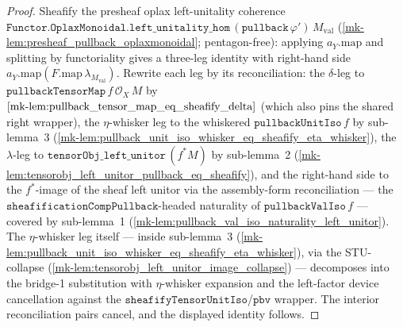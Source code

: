 \begin{proof}
  \leanok
  Sheafify the presheaf oplax left-unitality coherence
  \(\mathtt{Functor.OplaxMonoidal.left\_unitality\_hom}\,(\mathtt{pullback}\,\varphi')\,
  M_{\mathrm{val}}\) (\ref{mk-lem:presheaf_pullback_oplaxmonoidal}; pentagon-free): applying
  \(a_Y.\mathrm{map}\) and splitting by functoriality gives a three-leg identity with right-hand side
  \(a_Y.\mathrm{map}(F.\mathrm{map}\,\lambda_{M_{\mathrm{val}}})\). Rewrite each leg by its
  reconciliation: the \(\delta\)-leg to \(\mathtt{pullbackTensorMap}\,f\,\mathcal{O}_X\,M\) by
  \(\ref{mk-lem:pullback_tensor_map_eq_sheafify_delta}\) (which also pins the shared right wrapper), the
  \(\eta\)-whisker leg to the whiskered \(\mathtt{pullbackUnitIso}\,f\) by sub-lemma~3
  (\ref{mk-lem:pullback_unit_iso_whisker_eq_sheafify_eta_whisker}), the \(\lambda\)-leg to
  \(\mathtt{tensorObj\_left\_unitor}\,(f^{*}M)\) by sub-lemma~2
  (\ref{mk-lem:tensorobj_left_unitor_pullback_eq_sheafify}), and the right-hand side to the
  \(f^{*}\)-image of the sheaf left unitor via the assembly-form reconciliation --- the
  \(\mathtt{sheafificationCompPullback}\)-headed naturality of \(\mathtt{pullbackValIso}\,f\) ---
  covered by sub-lemma~1 (\ref{mk-lem:pullback_val_iso_naturality_left_unitor}). The
  \(\eta\)-whisker leg itself --- inside sub-lemma~3 (\ref{mk-lem:pullback_unit_iso_whisker_eq_sheafify_eta_whisker}),
  via the STU-collapse (\ref{mk-lem:tensorobj_left_unitor_image_collapse}) --- decomposes into the
  bridge-1 substitution with \(\eta\)-whisker expansion and the left-factor device cancellation against
  the \(\mathtt{sheafifyTensorUnitIso}\)/\(\mathtt{pbv}\) wrapper. The interior reconciliation pairs
  cancel, and the displayed identity follows.
\end{proof}

